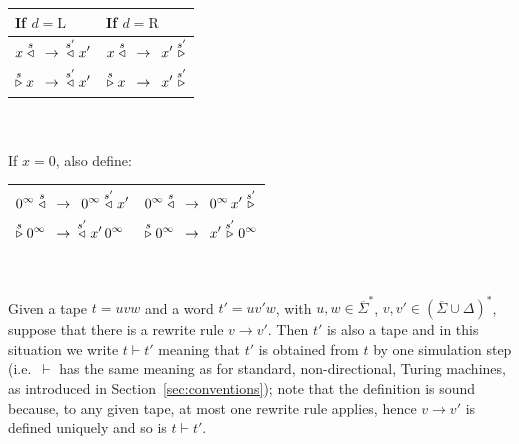 \begin{table}[h!]
    \centering
    \begin{tabular}{l|l}
        If $d = \text{L}$                               & If $d = \text{R}$ \\
        \hline
        $\begin{aligned}[t]
                 x \stackrel{s}\triangleleft\,\,\, & \to \,\,\, \stackrel{s'}\triangleleft x' \\
                 \stackrel{s}\triangleright x\,\,\, & \to \,\,\, \stackrel{s'}\triangleleft x'
             \end{aligned}$ & $\begin{aligned}[t]
                                   x \stackrel{s}\triangleleft\,\,\, & \to \,\,\, x' \stackrel{s'}\triangleright \\
                                   \stackrel{s}\triangleright x\,\,\, & \to \,\,\, x' \stackrel{s'}\triangleright
                               \end{aligned}$     \\
        \hline
    \end{tabular}\\
    \ \\ If $x=0$, also define: \\
    \begin{tabular}{l|l}
        \hline
        $\begin{aligned}[t]
                 0^\infty \stackrel{s}\triangleleft\,\,\, & \to \,\,\, 0^\infty \stackrel{s'}\triangleleft x'   \\
                 \stackrel{s}\triangleright 0^\infty\,\,\, & \to \,\,\, \stackrel{s'}\triangleleft x'\, 0^\infty
             \end{aligned}$ & $\begin{aligned}[t]
                                   0^\infty \stackrel{s}\triangleleft\,\,\, & \to \,\,\, 0^\infty \, x' \stackrel{s'}\triangleright \\
                                   \stackrel{s}\triangleright 0^\infty\,\,\, & \to \,\,\, x' \stackrel{s'}\triangleright 0^\infty
                               \end{aligned}$ \\
        \hline
    \end{tabular}\\
\end{table}

Given a tape $t=uvw$ and a word $t'=uv'w$, with $u,w\in \overline{\Sigma}^*$, $v,v' \in ( \overline \Sigma \cup \Delta)^*$, suppose that there is a rewrite rule $v \to v'$. Then $t'$ is also a tape and in this situation we write $t \vdash t'$ meaning that $t'$ is obtained from $t$ by one simulation step (i.e.\ $\vdash$ has the same meaning as for standard, non-directional, Turing machines, as introduced in Section~\ref{sec:conventions}); note that the definition is sound because, to any given tape, at most one rewrite rule applies, hence $v \to v'$ is defined uniquely and so is $t \vdash t'$.

